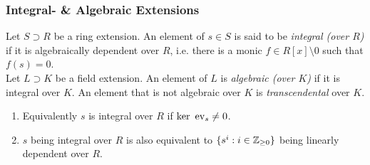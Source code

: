 \subsubsection{Integral- \& Algebraic Extensions}
\begin{definition}
    Let $S\supset R$ be a ring extension. An element of $s\in S$ is said to be \textit{integral (over $R$)} if it is algebraically dependent over $R$, i.e. there is a monic $f\in R[x]\setminus 0$ such that $f(s)=0$.\\
    Let $L\supset K$ be a field extension. An element of $L$ is \textit{algebraic (over $K$)} if it is integral over $K$. An element that is not algebraic over $K$ is \emph{transcendental} over $K$.\\ 
\end{definition}
\begin{remark}
    \begin{enumerate}
        \item Equivalently $s$ is integral over $R$ if $\ker \ \mathrm{ev}_s \neq 0 $. 
        \item $s$ being integral over $R$ is also equivalent to $\{s^i : i\in \mathbb{Z}_{\geq 0}\}$ being linearly dependent over $R$.  
    \end{enumerate}
\end{remark}

